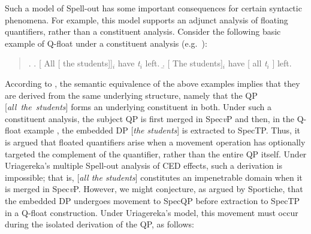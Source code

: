 Such a model of Spell-out has some important consequences for certain syntactic phenomena. For example, this model supports an adjunct analysis of floating quantifiers, rather than a constituent analysis. Consider the following basic example of Q-float under a constituent analysis (e.g.\ ):

\singlespacing
\begin{quote}
\ex.
\a. [ All [ the students]]$_{i}$ have {\it t}$_{i}$ left.
\b. [ The students]$_{i}$ have [ all {\it t}$_{i}$ ] left.

\end{quote}
\onehalfspacing
According to \citeauthor{sportiche1988}, the semantic equivalence of the above examples implies that they are derived from the same underlying structure, namely that the QP [{\it all~the~students}] forms an underlying constituent in both. Under such a constituent analysis, the subject QP is first merged in Spec{\it v}P and then, in the Q-float example \Last[b], the embedded DP [{\it the students}] is extracted to SpecTP. Thus, it is argued that floated quantifiers arise when a movement operation has optionally targeted the complement of the quantifier, rather than the entire QP itself. Under Uriagereka's multiple Spell-out analysis of CED effects, such a derivation is impossible; that is, [{\it all the students}] constitutes an impenetrable domain when it is merged in Spec{\it v}P. However, we might conjecture, as argued by Sportiche, that the embedded DP undergoes movement to SpecQP before extraction to SpecTP in a Q-float construction. Under Uriagereka's model, this movement must occur during the isolated derivation of the QP, as follows:

